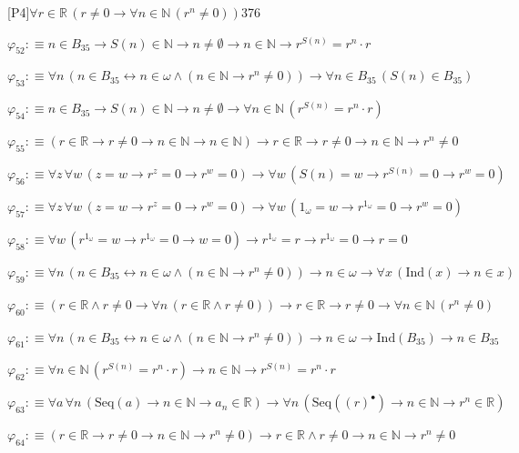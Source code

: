 \begin{fullproof}{[P4]}{$\forall r \in \mathbb{R}\,(r \neq 0 \to \forall n \in \mathbb{N}\,({{r}^{n}} \neq 0))$}{376}
\begin{abbrevlist}
\item $\varphi_{52} :\equiv n \in B_{35} \to S(n) \in \mathbb{N} \to n \neq \emptyset \to n \in \mathbb{N} \to {{r}^{S(n)}} = {{r}^{n}} \cdot r$
\item $\varphi_{53} :\equiv \forall n\,(n \in B_{35} \leftrightarrow n \in \omega \land (n \in \mathbb{N} \to {{r}^{n}} \neq 0)) \to \forall n \in B_{35}\,(S(n) \in B_{35})$
\item $\varphi_{54} :\equiv n \in B_{35} \to S(n) \in \mathbb{N} \to n \neq \emptyset \to \forall n \in \mathbb{N}\,({{r}^{S(n)}} = {{r}^{n}} \cdot r)$
\item $\varphi_{55} :\equiv (r \in \mathbb{R} \to r \neq 0 \to n \in \mathbb{N} \to n \in \mathbb{N}) \to r \in \mathbb{R} \to r \neq 0 \to n \in \mathbb{N} \to {{r}^{n}} \neq 0$
\item $\varphi_{56} :\equiv \forall z\,\forall w\,(z = w \to {{r}^{z}} = 0 \to {{r}^{w}} = 0) \to \forall w\,(S(n) = w \to {{r}^{S(n)}} = 0 \to {{r}^{w}} = 0)$
\item $\varphi_{57} :\equiv \forall z\,\forall w\,(z = w \to {{r}^{z}} = 0 \to {{r}^{w}} = 0) \to \forall w\,(1_{\omega} = w \to {{r}^{1_{\omega}}} = 0 \to {{r}^{w}} = 0)$
\item $\varphi_{58} :\equiv \forall w\,({{r}^{1_{\omega}}} = w \to {{r}^{1_{\omega}}} = 0 \to w = 0) \to {{r}^{1_{\omega}}} = r \to {{r}^{1_{\omega}}} = 0 \to r = 0$
\item $\varphi_{59} :\equiv \forall n\,(n \in B_{35} \leftrightarrow n \in \omega \land (n \in \mathbb{N} \to {{r}^{n}} \neq 0)) \to n \in \omega \to \forall x\,(\mathrm{Ind}(x) \to n \in x)$
\item $\varphi_{60} :\equiv (r \in \mathbb{R} \land r \neq 0 \to \forall n\,(r \in \mathbb{R} \land r \neq 0)) \to r \in \mathbb{R} \to r \neq 0 \to \forall n \in \mathbb{N}\,({{r}^{n}} \neq 0)$
\item $\varphi_{61} :\equiv \forall n\,(n \in B_{35} \leftrightarrow n \in \omega \land (n \in \mathbb{N} \to {{r}^{n}} \neq 0)) \to n \in \omega \to \mathrm{Ind}(B_{35}) \to n \in B_{35}$
\item $\varphi_{62} :\equiv \forall n \in \mathbb{N}\,({{r}^{S(n)}} = {{r}^{n}} \cdot r) \to n \in \mathbb{N} \to {{r}^{S(n)}} = {{r}^{n}} \cdot r$
\item $\varphi_{63} :\equiv \forall a\,\forall n\,(\mathrm{Seq}(a) \to n \in \mathbb{N} \to a_{n} \in \mathbb{R}) \to \forall n\,(\mathrm{Seq}({(r)^{\bullet}}) \to n \in \mathbb{N} \to {{r}^{n}} \in \mathbb{R})$
\item $\varphi_{64} :\equiv (r \in \mathbb{R} \to r \neq 0 \to n \in \mathbb{N} \to {{r}^{n}} \neq 0) \to r \in \mathbb{R} \land r \neq 0 \to n \in \mathbb{N} \to {{r}^{n}} \neq 0$

\end{abbrevlist}
\end{fullproof}

